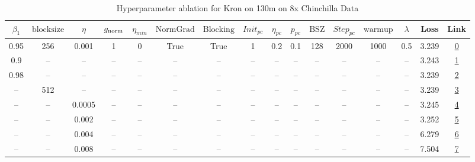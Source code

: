 \begin{table}[H]
\centering
\caption{Hyperparameter ablation for Kron on 130m on 8x Chinchilla Data}
\label{tab:ablation_kron_130m_on_8x_chinchilla_data}
\begin{tabular}{cccccccccccccccc}
\toprule
$\beta_1$ & $\mathrm{block size}$ & $\eta$ & $g_{\mathrm{norm}}$ & $\eta_{min}$ & $\mathrm{NormGrad}$ & $\mathrm{Blocking}$ & $Init_{pc}$ & $\eta_{pc}$ & $p_{pc}$ & $\mathrm{BSZ}$ & $Step_{pc}$ & $\mathrm{warmup}$ & $\lambda$ & Loss & Link \\
\midrule
0.95 & 256 & 0.001 & 1 & 0 & True & True & 1 & 0.2 & 0.1 & 128 & 2000 & 1000 & 0.5 & 3.239 & \href{https://wandb.ai/marin-community/optimizer-scaling/runs/sweep-130m-21B-kronz680ae4lr0.001-wd0.5-b10.95-plr0.2-pis1-gn1-n-f84dac}{0} \\
\midrule
0.9 & -- & -- & -- & -- & -- & -- & -- & -- & -- & -- & -- & -- & -- & 3.243 & \href{https://wandb.ai/marin-community/optimizer-scaling/runs/sweep-130m-21B-kron5f284blr0.001-wd0.5-b10.9-plr0.2-pis1-gn1-nor-853b92}{1} \\
0.98 & -- & -- & -- & -- & -- & -- & -- & -- & -- & -- & -- & -- & -- & 3.239 & \href{https://wandb.ai/marin-community/optimizer-scaling/runs/sweep-130m-21B-kron6aaf70lr0.001-wd0.5-b10.98-plr0.2-pis1-gn1-no-c11287}{2} \\
-- & 512 & -- & -- & -- & -- & -- & -- & -- & -- & -- & -- & -- & -- & 3.239 & \href{https://wandb.ai/marin-community/optimizer-scaling/runs/sweep-130m-21B-kron545c17lr0.001-wd0.5-b10.95-plr0.2-pis1-gn1-no-826ad5}{3} \\
-- & -- & 0.0005 & -- & -- & -- & -- & -- & -- & -- & -- & -- & -- & -- & 3.245 & \href{https://wandb.ai/marin-community/optimizer-scaling/runs/sweep-130m-21B-krona6b124lr0.0005-wd0.5-b10.95-plr0.2-pis1-gn1-n-220dba}{4} \\
-- & -- & 0.002 & -- & -- & -- & -- & -- & -- & -- & -- & -- & -- & -- & 3.252 & \href{https://wandb.ai/marin-community/optimizer-scaling/runs/sweep-130m-21B-kron570784lr0.002-wd0.5-b10.95-plr0.2-pis1-gn1-no-52c059}{5} \\
-- & -- & 0.004 & -- & -- & -- & -- & -- & -- & -- & -- & -- & -- & -- & 6.279 & \href{https://wandb.ai/marin-community/optimizer-scaling/runs/sweep-130m-21B-krona75eb9lr0.004-wd0.5-b10.95-plr0.2-pis1-gn1-no-b73759}{6} \\
-- & -- & 0.008 & -- & -- & -- & -- & -- & -- & -- & -- & -- & -- & -- & 7.504 & \href{https://wandb.ai/marin-community/optimizer-scaling/runs/sweep-130m-21B-kron5a8102lr0.008-wd0.5-b10.95-plr0.2-pis1-gn1-no-475004}{7} \\

\end{tabular}
\end{table}
